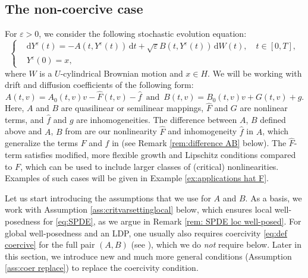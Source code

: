 \documentclass{amsart}
\newcommand{\dd}{\,\mathrm{d}}
\newcommand{\ddd}{\mathrm{d}}
\newcommand{\<}{\langle}
\newcommand{\?}{\rangle}
\theoremstyle{plain}
\theoremstyle{remark}
\theoremstyle{plain}
\numberwithin{equation}{section}
\newcommand{\eps}{\varepsilon}
\begin{document}
\subsection{The non-coercive case}\label{ss:mainresultnoncoercive}
For $\eps>0$, we consider the following  stochastic evolution  equation: 
\begin{equation}\label{eq:SPDE}
   \begin{cases}
  &\ddd Y^\eps(t)=-A(t,Y^\eps(t))\dd t+\sqrt{\eps}B(t,Y^\eps(t))\dd W(t), \quad t\in[0,T], \\
  &Y^\eps(0)=x,
\end{cases}
\end{equation}  
where $W$ is a $U$-cylindrical Brownian motion and $x\in H$. 
We will be working with  drift and diffusion coefficients of the following form:
\begin{equation*} 
A(t,v)=A_0(t,v)v-\hat{F}(t,v)-\hat{f} \, \text{ and } \, B(t,v)=B_0(t,v)v+G(t,v)+g. 
\end{equation*}
Here, $A$ and $B$ are quasilinear or semilinear mappings, $\hat{F}$ and $G$ are nonlinear terms, and $\hat{f}$ and $g$ are inhomogeneities. 
The difference between $A$, $B$ defined above and $A$, $B$ from \cite[Asm.\ 2.2]{TV24} are our nonlinearity $\hat{F}$  and inhomogeneity $\hat{f}$ in $A$, which  generalize the terms $F$ and $f$ in \cite[Asm.\ 2.2]{TV24} (see Remark \ref{rem:difference AB} below). The $\hat{F}$-term satisfies modified, more flexible growth and Lipschitz conditions compared to $F$, which can be used to include larger classes of (critical) nonlinearities. Examples of such cases will be given in Example \ref{ex:applications hat F}. 


Let us start introducing the assumptions that we use for $A$ and $B$. As a basis, we work with Assumption \ref{ass:critvarsettinglocal} below, which ensures local well-posedness for \eqref{eq:SPDE}, as we argue in Remark \ref{rem: SPDE loc well-posed}. For global well-posedness and an LDP,  one usually also requires coercivity \eqref{eq:def coercive} for the full pair $(A,B)$ (see \cite[(2.7), Th.\ 2.6]{TV24}), which we do \emph{not} require below.  
Later in this section, we introduce new and much more general conditions (Assumption \ref{ass:coer replace}) to replace the coercivity condition.  
 
\end{document}
